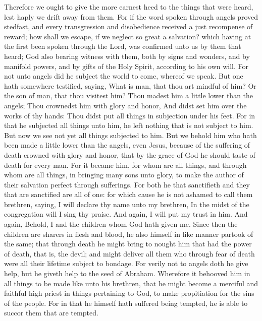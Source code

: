 Therefore we ought to give the more earnest heed to the things that were heard, lest haply we drift away from them. For if the word spoken through angels proved stedfast, and every transgression and disobedience received a just recompense of reward; how shall we escape, if we neglect so great a salvation? which having at the first been spoken through the Lord, was confirmed unto us by them that heard; God also bearing witness with them, both by signs and wonders, and by manifold powers, and by gifts of the Holy Spirit, according to his own will.  For not unto angels did he subject the world to come, whereof we speak. But one hath somewhere testified, saying, What is man, that thou art mindful of him? Or the son of man, that thou visitest him?  Thou madest him a little lower than the angels; Thou crownedst him with glory and honor, And didst set him over the works of thy hands:  Thou didst put all things in subjection under his feet. For in that he subjected all things unto him, he left nothing that is not subject to him. But now we see not yet all things subjected to him. But we behold him who hath been made a little lower than the angels, even Jesus, because of the suffering of death crowned with glory and honor, that by the grace of God he should taste of death for every man. For it became him, for whom are all things, and through whom are all things, in bringing many sons unto glory, to make the author of their salvation perfect through sufferings. For both he that sanctifieth and they that are sanctified are all of one: for which cause he is not ashamed to call them brethren, saying, I will declare thy name unto my brethren, In the midst of the congregation will I sing thy praise.  And again, I will put my trust in him. And again, Behold, I and the children whom God hath given me. Since then the children are sharers in flesh and blood, he also himself in like manner partook of the same; that through death he might bring to nought him that had the power of death, that is, the devil; and might deliver all them who through fear of death were all their lifetime subject to bondage. For verily not to angels doth he give help, but he giveth help to the seed of Abraham. Wherefore it behooved him in all things to be made like unto his brethren, that he might become a merciful and faithful high priest in things pertaining to God, to make propitiation for the sins of the people. For in that he himself hath suffered being tempted, he is able to succor them that are tempted. 


